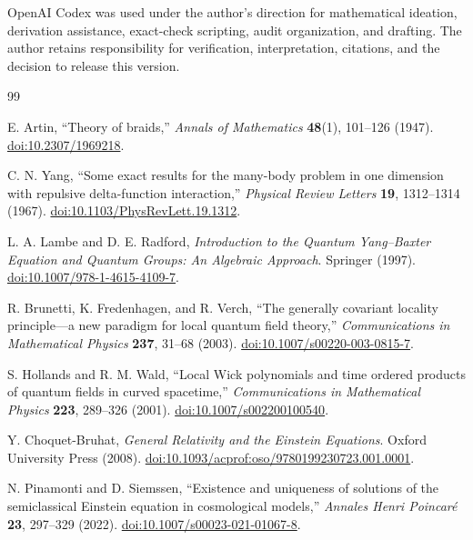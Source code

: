 \documentclass[11pt]{article}
\theoremstyle{definition}
\theoremstyle{remark}
\begin{document}
OpenAI Codex was used under the author's direction for mathematical ideation, derivation assistance, exact-check scripting, audit organization, and drafting. The author retains responsibility for verification, interpretation, citations, and the decision to release this version.

\begin{thebibliography}{99}

E. Artin, ``Theory of braids,'' \emph{Annals of Mathematics} \textbf{48}(1), 101--126 (1947). \href{https://doi.org/10.2307/1969218}{doi:10.2307/1969218}.

C. N. Yang, ``Some exact results for the many-body problem in one dimension with repulsive delta-function interaction,'' \emph{Physical Review Letters} \textbf{19}, 1312--1314 (1967). \href{https://doi.org/10.1103/PhysRevLett.19.1312}{doi:10.1103/PhysRevLett.19.1312}.

L. A. Lambe and D. E. Radford, \emph{Introduction to the Quantum Yang--Baxter Equation and Quantum Groups: An Algebraic Approach}. Springer (1997). \href{https://doi.org/10.1007/978-1-4615-4109-7}{doi:10.1007/978-1-4615-4109-7}.

R. Brunetti, K. Fredenhagen, and R. Verch, ``The generally covariant locality principle---a new paradigm for local quantum field theory,'' \emph{Communications in Mathematical Physics} \textbf{237}, 31--68 (2003). \href{https://doi.org/10.1007/s00220-003-0815-7}{doi:10.1007/s00220-003-0815-7}.

S. Hollands and R. M. Wald, ``Local Wick polynomials and time ordered products of quantum fields in curved spacetime,'' \emph{Communications in Mathematical Physics} \textbf{223}, 289--326 (2001). \href{https://doi.org/10.1007/s002200100540}{doi:10.1007/s002200100540}.

Y. Choquet-Bruhat, \emph{General Relativity and the Einstein Equations}. Oxford University Press (2008). \href{https://doi.org/10.1093/acprof:oso/9780199230723.001.0001}{doi:10.1093/acprof:oso/9780199230723.001.0001}.

N. Pinamonti and D. Siemssen, ``Existence and uniqueness of solutions of the semiclassical Einstein equation in cosmological models,'' \emph{Annales Henri Poincar\'e} \textbf{23}, 297--329 (2022). \href{https://doi.org/10.1007/s00023-021-01067-8}{doi:10.1007/s00023-021-01067-8}.


\end{thebibliography}
\end{document}
